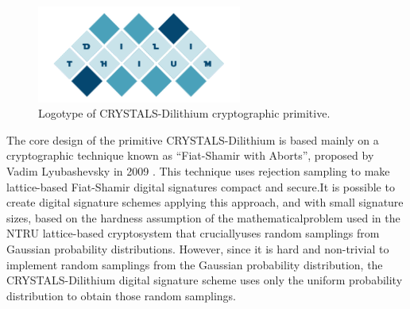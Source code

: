 \documentclass[runningheads]{llncs}
\numberwithin{equation}{section}
\begin{document}
    
    \vspace{-3ex}
    \begin{figure}[!ht]
        \centering
        \captionsetup{justification=centering}
        \includegraphics[width=0.6\textwidth]{figures/sections/section-3/crystals-dilithium.pdf}
        \caption{Logotype of CRYSTALS-Dilithium cryptographic primitive.}
        \label{fig:crystals-dilithium-logo}
    \end{figure}


    \noindent The core design of the primitive CRYSTALS-Dilithium is based mainly on a cryptographic technique known as ``Fiat-Shamir with Aborts'', proposed by Vadim Lyubashevsky in 2009 \cite{lyubashevsky:fiat-shamir-with-aborts-applications-lattice-and-factoring-based-signatures:2009:06-2024,lyubashevsky:lattice-signatures-without-trapdoors:2012:06-2024}. This technique uses rejection sampling to make lattice-based Fiat-Shamir digital signatures \cite{fiat-shamir:how-prove-yourself-practical-solutions-identification-and-signature-problems:1987:06-2024} compact and secure.\break It is possible to create digital signature schemes applying this approach, and with small signature sizes, based on the hardness assumption of the mathematical\break problem used in the NTRU lattice-based cryptosystem \cite{hoffstein-pipher-silverman:ntru-ring-based-public-key-cryptosystem:1998:06-2024} that crucially\break uses random samplings from Gaussian probability distributions. However, since it is hard and non-trivial to implement random samplings from the Gaussian probability distribution, the CRYSTALS-Dilithium digital signature scheme uses only the uniform probability distribution to obtain those random samplings.
    
\end{document}
